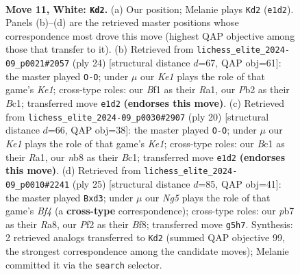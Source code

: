 \documentclass[11pt]{article}
\begin{document}
\clearpage

\begin{figure}[p]\centering
\begin{subfigure}{0.46\textwidth}\centering
\resizebox{\linewidth}{!}{%
\newchessgame
\chessboard[
  setfen={rnbqk1r1/pp2bppp/5n2/3p2N1/3P4/2N5/PP3PPP/R1BQKB1R w - - 4 11},
  showmover=false,
  pgfstyle=straightmove, color=movearrow, markmove={e1-d2}
]}
\caption{}
\end{subfigure}\hfill
\begin{subfigure}{0.46\textwidth}\centering
\resizebox{\linewidth}{!}{%
\newchessgame
\chessboard[
  setfen={r1bq1rk1/ppp3pp/5n2/3pb3/8/2PBN3/PP3PPP/R1BQK2R w KQ - 0 13},
  showmover=false,
  pgfstyle=straightmove, color=movearrow, markmove={e1-g1}
]}
\caption{}
\end{subfigure}
\\[4pt]
\begin{subfigure}{0.46\textwidth}\centering
\resizebox{\linewidth}{!}{%
\newchessgame
\chessboard[
  setfen={r2qkb1r/pp1b1ppp/4pn2/8/3N4/2P5/PPB2PPP/R1BQK2R w KQkq - 1 11},
  showmover=false,
  pgfstyle=straightmove, color=movearrow, markmove={e1-g1}
]}
\caption{}
\end{subfigure}\hfill
\begin{subfigure}{0.46\textwidth}\centering
\resizebox{\linewidth}{!}{%
\newchessgame
\chessboard[
  setfen={r3kb1r/pp3ppp/1qn2n2/5b2/8/3P1NP1/PP1BNPBP/R1Q1K2R b KQkq - 0 13},
  showmover=false,
  pgfstyle=straightmove, color=movearrow, markmove={f5-d3}
]}
\caption{}
\end{subfigure}
\caption{\textbf{Move 11, White: \texttt{Kd2}.} (a) Our position; Melanie plays \texttt{Kd2} (\texttt{e1d2}). Panels (b)--(d) are the retrieved master positions whose correspondence most drove this move (highest QAP objective among those that transfer to it). (b) Retrieved from \texttt{lichess\_elite\_2024-09\_p0021\#2057} (ply 24) [structural distance $d$=67, QAP obj=61]: the master played \texttt{O-O}; under $\mu$ our \emph{Ke1} plays the role of that game's \emph{Ke1}; cross-type roles: our \emph{B}f1 as their \emph{R}a1, our \emph{P}b2 as their \emph{B}c1; transferred move \texttt{e1d2} \textbf{(endorses this move)}. (c) Retrieved from \texttt{lichess\_elite\_2024-09\_p0030\#2907} (ply 20) [structural distance $d$=66, QAP obj=38]: the master played \texttt{O-O}; under $\mu$ our \emph{Ke1} plays the role of that game's \emph{Ke1}; cross-type roles: our \emph{B}c1 as their \emph{R}a1, our \emph{n}b8 as their \emph{B}c1; transferred move \texttt{e1d2} \textbf{(endorses this move)}. (d) Retrieved from \texttt{lichess\_elite\_2024-09\_p0010\#2241} (ply 25) [structural distance $d$=85, QAP obj=41]: the master played \texttt{Bxd3}; under $\mu$ our \emph{Ng5} plays the role of that game's \emph{Bf4} (a \textbf{cross-type} correspondence); cross-type roles: our \emph{p}b7 as their \emph{R}a8, our \emph{P}f2 as their \emph{B}f8; transferred move \texttt{g5h7}. Synthesis: 2 retrieved analogs transferred to \texttt{Kd2} (summed QAP objective 99, the strongest correspondence among the candidate moves); Melanie committed it via the \texttt{search} selector.}
\label{fig:thought-m20}
\end{figure}
\end{document}
